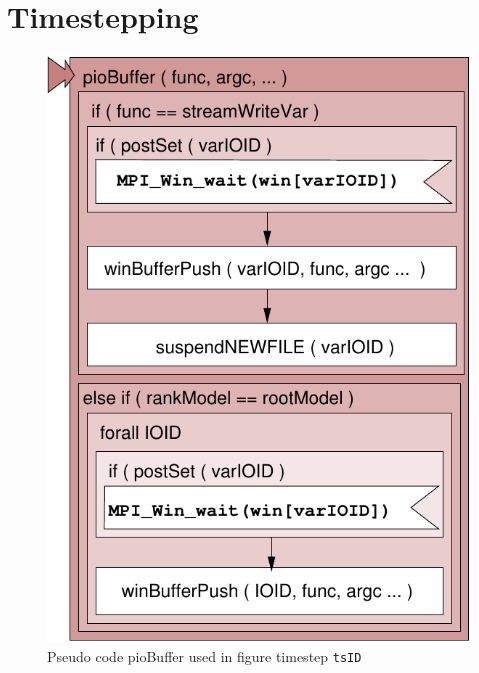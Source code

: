 \section{Timestepping}

\begin{figure}[H]
\centering
\includegraphics[scale=0.6]{../graphics/pioBuffer.pdf}
\caption {Pseudo code pioBuffer used in figure timestep {\tt tsID}}
\end{figure}

